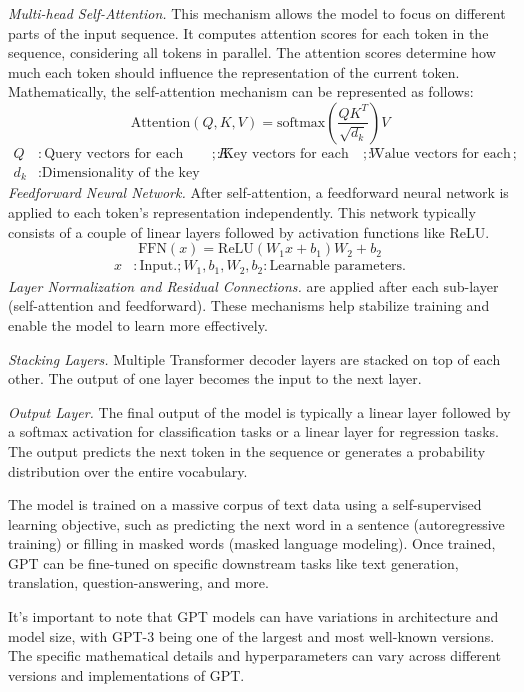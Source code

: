 {\em Multi-head Self-Attention.} This mechanism allows the model to
focus on different parts of the input sequence. It computes attention
scores for each token in the sequence, considering all tokens in
parallel. The attention scores determine how much each token should
influence the representation of the current token. Mathematically, the
self-attention mechanism can be represented as follows:
$$\text{Attention}(Q, K, V) = \text{softmax}\left(\frac{QK^T}{\sqrt{d_k}}\right)V$$
\begin{align*}
Q & : \text{Query vectors for each token.}; K & : \text{Key vectors for each token.}; V & : \text{Value vectors for each token.};\\d_k & : \text{Dimensionality of the key vectors.}
\end{align*}
{\em Feedforward Neural Network.} After self-attention, a feedforward neural network is applied to each token's representation independently. This network typically consists of a couple of linear layers followed by activation functions like ReLU.
\[
\text{FFN}(x) = \text{ReLU}(W_1x + b_1)W_2 + b_2
\]
\begin{align*}
x & : \text{Input.}; W_1, b_1, W_2, b_2 : \text{Learnable parameters.}
\end{align*}
{\em Layer Normalization and Residual Connections.} are applied after each
sub-layer (self-attention and feedforward). These mechanisms help
stabilize training and enable the model to learn more effectively.


{\em Stacking Layers.} Multiple Transformer decoder layers are stacked
on top of each other. The output of one layer becomes the input to the
next layer.

{\em Output Layer.} The final output of the model is typically a
linear layer followed by a softmax activation for classification tasks
or a linear layer for regression tasks. The output predicts the next
token in the sequence or generates a probability distribution over the
entire vocabulary.

The model is trained on a massive corpus of text data using a self-supervised learning objective, such as predicting the next word in a sentence (autoregressive training) or filling in masked words (masked language modeling). Once trained, GPT can be fine-tuned on specific downstream tasks like text generation, translation, question-answering, and more.

It's important to note that GPT models can have variations in
architecture and model size, with GPT-3 being one of the largest and
most well-known versions. The specific mathematical details and
hyperparameters can vary across different versions and implementations
of GPT.

%

